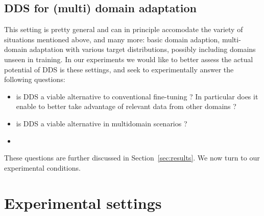 \documentclass[11pt,a4paper]{article}
\newcommand{\fyTodo}[1]{\Todo[FY:]{\textcolor{orange}{#1}}}
\newcommand{\system}[1]{\texttt{{#1}}}
\begin{document}
\fyTodo{Explain lr, may be more}\fyTodo{More refs to the algorithm }
\subsection{DDS for (multi) domain adaptation}

This setting is pretty general and can in principle accomodate the variety of situations mentioned  above, and many more: basic domain adaption, multi-domain adaptation with various target distributions, possibly including domains unseen in training. In our experiments we would like to better assess the actual potential of DDS is these settings, and seek to experimentally answer the following questions:
\begin{itemize}
\item is DDS a viable alternative to conventional fine-tuning ? In particular does it enable to better take advantage of relevant data from other domains ?
\item is DDS a viable alternative in multidomain scenarios ?
\item \fyTodo{TBContinued}
\end{itemize}

These questions are further discussed in Section~\ref{sec:results}. We now turn to our experimental conditions.

\section{Experimental settings} \label{sec:exp}
\end{document}
